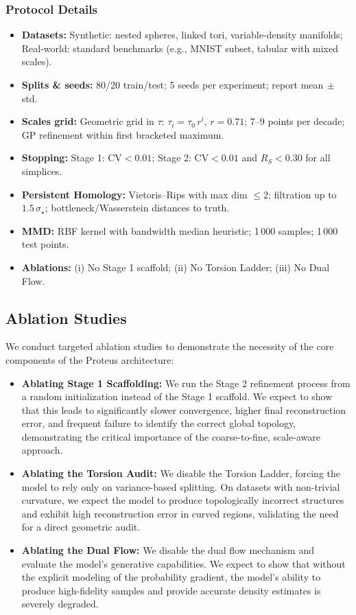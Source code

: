\documentclass[11pt]{article}
\begin{document}
\subsubsection{Protocol Details}
\begin{itemize}[leftmargin=1.5em]
    \item \textbf{Datasets:} Synthetic: nested spheres, linked tori, variable-density manifolds; Real-world: standard benchmarks (e.g., MNIST subset, tabular with mixed scales).
    \item \textbf{Splits \& seeds:} 80/20 train/test; 5 seeds per experiment; report mean$\,\pm$std.
    \item \textbf{Scales grid:} Geometric grid in $\tau$: $\tau_i = \tau_0\,r^i$, $r{=}0.71$; 7--9 points per decade; GP refinement within first bracketed maximum.
    \item \textbf{Stopping:} Stage 1: CV$<0.01$; Stage 2: CV$<0.01$ and $R_S{<}0.30$ for all simplices.
    \item \textbf{Persistent Homology:} Vietoris--Rips with max dim $\le2$; filtration up to $1.5\,\sigma_\star$; bottleneck/Wasserstein distances to truth.
    \item \textbf{MMD:} RBF kernel with bandwidth median heuristic; 1\,000 samples; 1\,000 test points.
    \item \textbf{Ablations:} (i) No Stage 1 scaffold; (ii) No Torsion Ladder; (iii) No Dual Flow.
\end{itemize}

\subsection{Ablation Studies}
We conduct targeted ablation studies to demonstrate the necessity of the core components of the Proteus architecture:
\begin{itemize}
    \item \textbf{Ablating Stage 1 Scaffolding:} We run the Stage 2 refinement process from a random initialization instead of the Stage 1 scaffold. We expect to show that this leads to significantly slower convergence, higher final reconstruction error, and frequent failure to identify the correct global topology, demonstrating the critical importance of the coarse-to-fine, scale-aware approach.
    \item \textbf{Ablating the Torsion Audit:} We disable the Torsion Ladder, forcing the model to rely only on variance-based splitting. On datasets with non-trivial curvature, we expect the model to produce topologically incorrect structures and exhibit high reconstruction error in curved regions, validating the need for a direct geometric audit.
    \item \textbf{Ablating the Dual Flow:} We disable the dual flow mechanism and evaluate the model's generative capabilities. We expect to show that without the explicit modeling of the probability gradient, the model's ability to produce high-fidelity samples and provide accurate density estimates is severely degraded.
\end{itemize}
\end{document}
